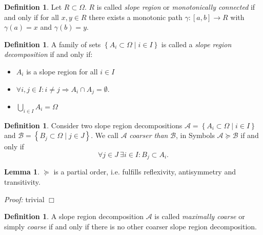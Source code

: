\documentclass[a4paper,12pt]{paper}
\theoremstyle{plain}
\theoremstyle{definition}
\newtheorem{defn}[thm]{Definition} %
\newtheorem{lem}[thm]{Lemma}
\begin{document}
\begin{defn}
Let $R \subset \Omega$. $R$ is called \emph{slope region} or \emph{monotonically connected} if and only if for all $x, y \in R$ there exists a monotonic path $\gamma: [a,b] \to R$ with $\gamma(a) = x$ and $\gamma(b) = y$.
\end{defn}

\begin{defn}
A family of sets $\left\{ A_i \subset \Omega \mid i \in I \right\}$ is called a \emph{slope region decomposition} if and only if:
\begin{itemize}
\item $A_i$ is a slope region for all $i \in I$
\item $\forall i,j \in I: i \neq j \Rightarrow A_i \cap A_j = \emptyset$.
\item $\bigcup_{i\in I} A_i = \Omega$
\end{itemize}
\end{defn}



\begin{defn}
Consider two slope region decompositions $\mathcal{A} = \left\{ A_i \subset \Omega \mid i \in I \right\}$ and $\mathcal{B} = \left\{ B_j \subset \Omega \mid j \in J \right\}$. We call $\mathcal{A}$ \emph{coarser than} $\mathcal{B}$, in Symbols $\mathcal{A} \succeq \mathcal{B}$ if and only if
\begin{equation*}
\forall j \in J ~ \exists i \in I: B_j \subset A_i.
\end{equation*}
\end{defn}

\begin{lem}
$\succeq$ is a partial order, i.e. fulfills reflexivity, antisymmetry and transitivity.

\emph{Proof:} trivial \hfill $\Box$
\end{lem}

\begin{defn}
A slope region decomposition $\mathcal{A}$ is called \emph{maximally coarse} or simply \emph{coarse} if and only if there is no other coarser slope region decomposition.
\end{defn}
\end{document}
